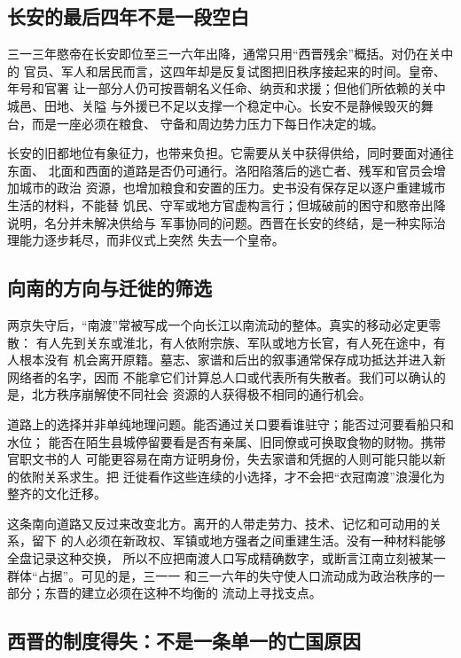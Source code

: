\subsection{长安的最后四年不是一段空白}

三一三年愍帝在长安即位至三一六年出降，通常只用“西晋残余”概括。对仍在关中的
官员、军人和居民而言，这四年却是反复试图把旧秩序接起来的时间。皇帝、年号和官署
让一部分人仍可按晋朝名义任命、纳贡和求援；但他们所依赖的关中城邑、田地、关隘
与外援已不足以支撑一个稳定中心。长安不是静候毁灭的舞台，而是一座必须在粮食、
守备和周边势力压力下每日作决定的城。

长安的旧都地位有象征力，也带来负担。它需要从关中获得供给，同时要面对通往东面、
北面和西面的道路是否仍可通行。洛阳陷落后的逃亡者、残军和官员会增加城市的政治
资源，也增加粮食和安置的压力。史书没有保存足以逐户重建城市生活的材料，不能替
饥民、守军或地方官虚构言行；但城破前的困守和愍帝出降说明，名分并未解决供给与
军事协同的问题。西晋在长安的终结，是一种实际治理能力逐步耗尽，而非仪式上突然
失去一个皇帝。

\subsection{向南的方向与迁徙的筛选}

两京失守后，“南渡”常被写成一个向长江以南流动的整体。真实的移动必定更零散：
有人先到关东或淮北，有人依附宗族、军队或地方长官，有人死在途中，有人根本没有
机会离开原籍。墓志、家谱和后出的叙事通常保存成功抵达并进入新网络者的名字，因而
不能拿它们计算总人口或代表所有失散者。我们可以确认的是，北方秩序崩解使不同社会
资源的人获得极不相同的通行机会。

道路上的选择并非单纯地理问题。能否通过关口要看谁驻守；能否过河要看船只和水位；
能否在陌生县城停留要看是否有亲属、旧同僚或可换取食物的财物。携带官职文书的人
可能更容易在南方证明身份，失去家谱和凭据的人则可能只能以新的依附关系求生。把
迁徙看作这些连续的小选择，才不会把“衣冠南渡”浪漫化为整齐的文化迁移。

这条南向道路又反过来改变北方。离开的人带走劳力、技术、记忆和可动用的关系，留下
的人必须在新政权、军镇或地方强者之间重建生活。没有一种材料能够全盘记录这种交换，
所以不应把南渡人口写成精确数字，或断言江南立刻被某一群体“占据”。可见的是，三一一
和三一六年的失守使人口流动成为政治秩序的一部分；东晋的建立必须在这种不均衡的
流动上寻找支点。

\subsection{西晋的制度得失：不是一条单一的亡国原因}

